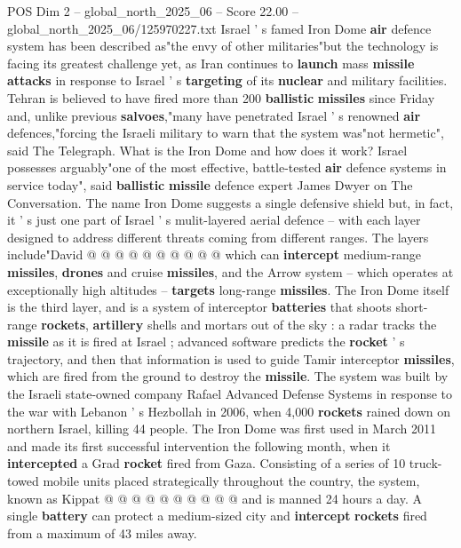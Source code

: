 \begin{textsample}{POS Dim 2 – global\_north\_2025\_06 – Score 22.00 – global\_north\_2025\_06/125970227.txt}  \label{ex:f2_pos_357}
Israel ' s famed Iron Dome \textbf{air} defence system has been described as"the envy of other militaries"but the technology is facing its greatest challenge yet, as Iran continues to \textbf{launch} mass \textbf{missile} \textbf{attacks} in response to Israel ' s \textbf{targeting} of its \textbf{nuclear} and military facilities.
Tehran is believed to have fired more than 200 \textbf{ballistic} \textbf{missiles} since Friday and, unlike previous \textbf{salvoes},"many have penetrated Israel ' s renowned \textbf{air} defences,"forcing the Israeli military to warn that the system was"not hermetic", said The Telegraph.
What is the Iron Dome and how does it work?
Israel possesses arguably"one of the most effective, battle-tested \textbf{air} defence systems in service today", said \textbf{ballistic} \textbf{missile} defence expert James Dwyer on The Conversation.
The name Iron Dome suggests a single defensive shield but, in fact, it ' s just one part of Israel ' s mulit-layered aerial defence -- with each layer designed to address different threats coming from different ranges.
The layers include"David @ @ @ @ @ @ @ @ @ @ which can \textbf{intercept} medium-range \textbf{missiles}, \textbf{drones} and cruise \textbf{missiles}, and the Arrow system -- which operates at exceptionally high altitudes -- \textbf{targets} long-range \textbf{missiles}.
The Iron Dome itself is the third layer, and is a system of interceptor \textbf{batteries} that shoots short-range \textbf{rockets}, \textbf{artillery} shells and mortars out of the sky : a radar tracks the \textbf{missile} as it is fired at Israel ; advanced software predicts the \textbf{rocket} ' s trajectory, and then that information is used to guide Tamir interceptor \textbf{missiles}, which are fired from the ground to destroy the \textbf{missile}.
The system was built by the Israeli state-owned company Rafael Advanced Defense Systems in response to the war with Lebanon ' s Hezbollah in 2006, when 4,000 \textbf{rockets} rained down on northern Israel, killing 44 people.
The Iron Dome was first used in March 2011 and made its first successful intervention the following month, when it \textbf{intercepted} a Grad \textbf{rocket} fired from Gaza.
Consisting of a series of 10 truck-towed mobile units placed strategically throughout the country, the system, known as Kippat @ @ @ @ @ @ @ @ @ @ and is manned 24 hours a day.
A single \textbf{battery} can protect a medium-sized city and \textbf{intercept} \textbf{rockets} fired from a maximum of 43 miles away.

\end{textsample}
